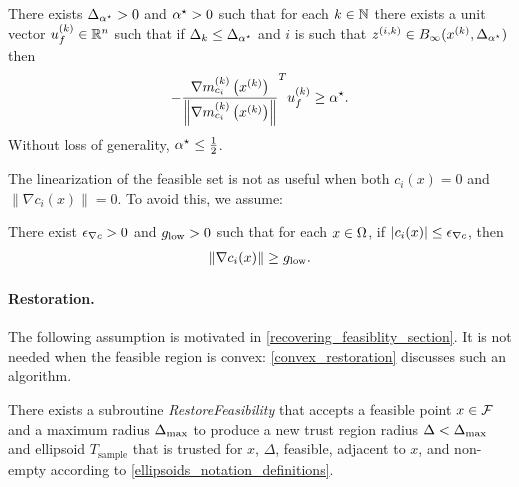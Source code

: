\begin{assumption}
\label{minangleassumption_alt}
There exists ${\Delta_{\alpha^{\star}}} > 0$ and ${ \alpha^{\star} } > 0$ such that for each $k \in \mathbb N$ there exists
a unit vector ${u^{(k)}_f} \in \mathbb R^n$
such that if $\Delta_k \le {\Delta_{\alpha^{\star}}}$ and
$i$ is such that ${z^{(i, k)}} \in B_{\infty}(x^{(k)}, {\Delta_{\alpha^{\star}}})$
then
\begin{align*}
-\frac {{\nabla m_{c_i}^{(k)}\left(x^{(k)}\right)}}{\left\|{\nabla m_{c_i}^{(k)}\left(x^{(k)}\right)}\right\|} ^T{u^{(k)}_f} \ge { \alpha^{\star} }.
\end{align*}
Without loss of generality, ${ \alpha^{\star} } \le \frac 1 2$.
\end{assumption}


% 

The linearization of the feasible set is not as useful when both $c_i(x) = 0$ and $\left\|\nabla c_i(x)\right\| = 0$.
To avoid this, we assume:
\begin{assumption}
\label{mingradassumption}
There exist ${\epsilon_{\nabla c}} > 0$ and ${ g_{\textrm{low}} } > 0$ such that for each $x \in \Omega$, if $\left|c_i(x)\right| \le {\epsilon_{\nabla c}}$, then
\begin{align*}
\| \nabla c_i(x) \| \ge { g_{\textrm{low}} }.
\end{align*}
\end{assumption}


\paragraph*{Restoration.}

The following assumption is motivated in \cref{recovering_feasiblity_section}.
It is not needed when the feasible region is convex: \cref{convex_restoration} discusses such an algorithm.
\begin{assumption}
\label{restorability_assumption}
There exists a subroutine \emph{RestoreFeasibility} that accepts a feasible point $x \in {\mathcal F}$ and a maximum radius ${\Delta_{\textrm{max}}}$ to produce
a new trust region radius $\Delta < {\Delta_{\textrm{max}}}$ and ellipsoid $T_{\textrm{sample}}$ that is trusted for 
$x$, $\Delta$, feasible, adjacent to $x$, and non-empty according to \cref{ellipsoids_notation_definitions}.
\end{assumption}

